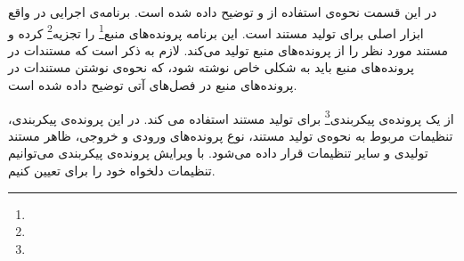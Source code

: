 در این قسمت  نحوه‌ی استفاده از  و  توضیح داده شده است. 
برنامه‌ی اجرایی  در واقع ابزار اصلی برای تولید مستند است. این برنامه پرونده‌های منبع\footnote{} را تجزیه\footnote{}
 کرده و مستند مورد نظر را از پرونده‌های منبع تولید می‌کند. لازم به ذکر است که مستندات در پرونده‌های منبع باید 
به شکلی خاص نوشته شود، که نحوه‌ی نوشتن مستندات در پرونده‌های منبع در فصل‌های آتی توضیح داده شده است.

از یک پرونده‌ی پیکربندی\footnote{}
 برای تولید مستند استفاده می کند. در این پرونده‌ی پیکربندی، تنظیمات مربوط به نحوه‌ی تولید مستند، 
نوع پرونده‌های ورودی و خروجی، ظاهر مستند تولیدی و سایر تنظیمات قرار داده می‌شود. با ویرایش پرونده‌ی پیکربندی می‌توانیم تنظیمات 
دلخواه خود را برای  تعیین کنیم.

